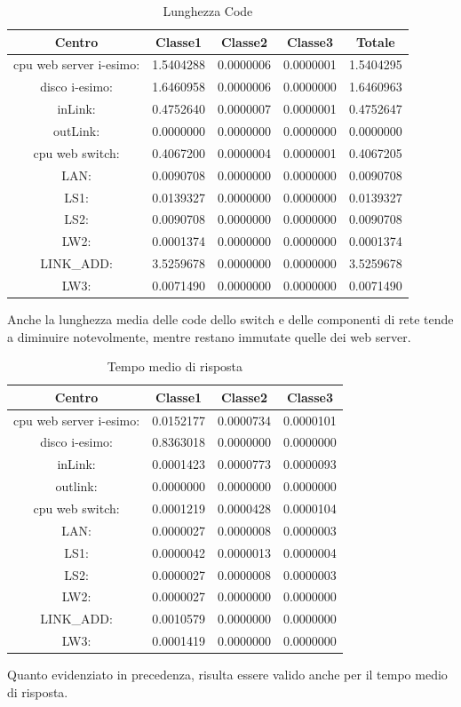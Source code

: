 \begin{table}[htbp]
\begin{center}
\begin{tabular}{||c|c|c|c|c||}
\hline
Centro &Classe1 &Classe2 &Classe3 &Totale\\
\hline
\hline
 cpu web server i-esimo: 	&1.5404288	&0.0000006	&0.0000001	&1.5404295\\
\hline
 disco i-esimo: 	&1.6460958	&0.0000006	&0.0000000	&1.6460963\\
\hline
 inLink: 	&0.4752640	&0.0000007	&0.0000001	&0.4752647\\
\hline
 outLink: 	&0.0000000	&0.0000000	&0.0000000	&0.0000000\\
\hline
 cpu web switch: 	&0.4067200	&0.0000004	&0.0000001	&0.4067205\\
\hline
 LAN: 	&0.0090708	&0.0000000	&0.0000000	&0.0090708\\
\hline
 LS1: 	&0.0139327	&0.0000000	&0.0000000	&0.0139327\\
\hline
 LS2: 	&0.0090708	&0.0000000	&0.0000000	&0.0090708\\
\hline
 LW2: 	&0.0001374	&0.0000000	&0.0000000	&0.0001374\\
\hline
 LINK\_ADD: 	&3.5259678	&0.0000000	&0.0000000	&3.5259678\\
\hline
 LW3: 	&0.0071490	&0.0000000	&0.0000000	&0.0071490\\
\hline
\end{tabular}
\end{center}
\caption{Lunghezza Code}
\label{lunghezzacode}
\end{table}
Anche la lunghezza media delle code dello switch e delle componenti di rete tende a diminuire notevolmente, mentre restano immutate quelle dei web server.
\begin{table}[htbp]
\begin{center}
\begin{tabular}{||c|c|c|c||}
\hline
Centro &Classe1 &Classe2 &Classe3\\
\hline
\hline
 cpu web server i-esimo: 	&0.0152177	&0.0000734	&0.0000101\\
\hline
 disco i-esimo: 	&0.8363018	&0.0000000	&0.0000000\\
\hline
 inLink: 	&0.0001423	&0.0000773	&0.0000093\\
\hline
 outlink: 	&0.0000000	&0.0000000	&0.0000000\\
\hline
 cpu web switch: 	&0.0001219	&0.0000428	&0.0000104\\
\hline
 LAN: 	&0.0000027	&0.0000008	&0.0000003\\
\hline
 LS1: 	&0.0000042	&0.0000013	&0.0000004\\
\hline
 LS2: 	&0.0000027	&0.0000008	&0.0000003\\
\hline
 LW2: 	&0.0000027	&0.0000000	&0.0000000\\
\hline
 LINK\_ADD: 	&0.0010579	&0.0000000	&0.0000000\\
\hline
 LW3: 	&0.0001419	&0.0000000	&0.0000000\\
\hline
\end{tabular}
\end{center}
\caption{Tempo medio di risposta}
\label{tempomediodirisposta}
\end{table}
Quanto evidenziato in precedenza, risulta essere valido anche per il tempo medio di risposta.
